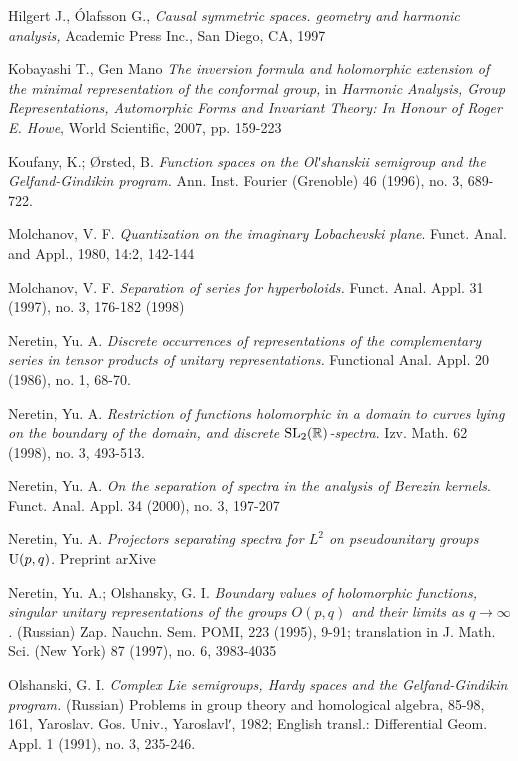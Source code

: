 \documentclass{article}
\begin{document}
\begin{thebibliography}{cc}

 Hilgert J., \'Olafsson G., {\it Causal symmetric spaces. geometry and harmonic analysis,} 
 Academic Press Inc., San Diego, CA, 1997

 Kobayashi T., Gen Mano
{\it The inversion formula and holomorphic extension of the minimal representation of the conformal group,}
in {\it Harmonic Analysis, Group Representations, Automorphic Forms and Invariant Theory:
In Honour of Roger E. Howe}, World Scientific, 2007, pp. 159-223
 
 Koufany, K.; \O rsted, B. {\it Function spaces on the Olʹshanskii semigroup and the Gelfand-Gindikin program.}
  Ann. Inst. Fourier (Grenoble) 46 (1996), no. 3, 689-722. 

Molchanov, V. F.
{\it Quantization on the imaginary Lobachevski plane}. 
Funct. Anal. and Appl., 1980, 14:2, 142-144

 
 Molchanov, V. F.
{\it Separation of series for hyperboloids.}
Funct. Anal. Appl. 31 (1997), no. 3, 176-182 (1998) 

Neretin, Yu. A.
{\it Discrete occurrences of representations of the complementary series in tensor products 
of unitary representations.}  Functional Anal. Appl. 20 (1986), no. 1, 68-70. 

Neretin, Yu. A.
{\it Restriction of functions holomorphic in a domain to curves lying on the boundary of the domain,
and discrete $\mathrm {SL}_2({\mathbb R })$-spectra}. 
Izv. Math. 62 (1998), no. 3, 493-513.

Neretin, Yu. A.
{\it On the separation of spectra in the analysis of Berezin kernels}. 
Funct. Anal. Appl. 34 (2000), no. 3, 197-207 

Neretin, Yu. A.
{\it  Projectors separating  spectra
  for $L^2$ on pseudounitary groups $\mathrm U(p,q)$.} Preprint arXive

Neretin, Yu. A.; Olshansky, G. I. {\it  Boundary values of holomorphic functions, 
singular unitary representations of the groups $O(p,q)$ and their limits as 
$q\to\infty$.} (Russian) Zap. Nauchn. Sem. POMI, 223 (1995), 9-91;
translation in J. Math. Sci. (New York) 87 (1997), no. 6, 3983-4035 

Olshanski, G. I. {\it Complex Lie semigroups, Hardy spaces and the Gelfand-Gindikin program.}
(Russian) Problems in group theory and homological algebra, 85-98, 161, Yaroslav. Gos. Univ.,
Yaroslavlʹ, 1982; English transl.:
 Differential Geom. Appl. 1 (1991), no. 3, 235-246.


\end{thebibliography}
\end{document}
